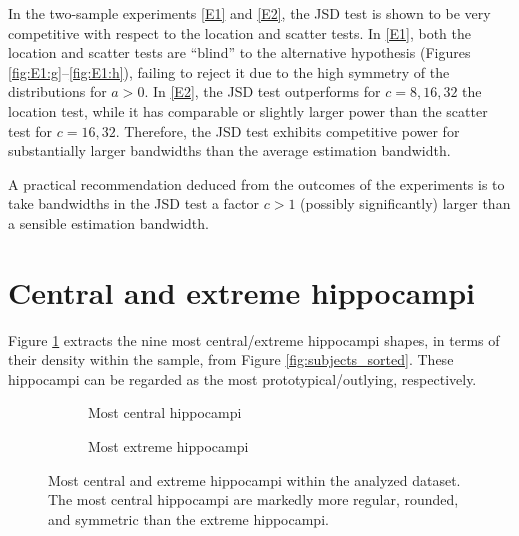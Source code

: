 \documentclass[oneside,11pt]{article}
\begin{document}
In the two-sample experiments \ref{E1} and \ref{E2}, the JSD test is shown to be very competitive with respect to the location and scatter tests. In \ref{E1}, both the location and scatter tests are ``blind'' to the alternative hypothesis (Figures \ref{fig:E1:g}--\ref{fig:E1:h}), failing to reject it due to the high symmetry of the distributions for $a>0$. In \ref{E2}, the JSD test outperforms for $c=8,16,32$ the location test, while it has comparable or slightly larger power than the scatter test for $c=16,32$. Therefore, the JSD test exhibits competitive power for substantially larger bandwidths than the average estimation bandwidth.

A practical recommendation deduced from the outcomes of the experiments is to take bandwidths in the JSD test a factor $c>1$ (possibly significantly) larger than a sensible estimation bandwidth.

\section{Central and extreme hippocampi}
\label{sec:extremehippo}

Figure \ref{fig:in_out} extracts the nine most central/extreme hippocampi shapes, in terms of their density within the sample, from Figure \ref{fig:subjects_sorted}. These hippocampi can be regarded as the most prototypical/outlying, respectively.

\begin{figure}[htpb!]
    \centering
    \begin{subfigure}[t]{0.5\textwidth}
        \centering
        \caption{\small Most central hippocampi}
    \end{subfigure}%
    \begin{subfigure}[t]{0.5\textwidth}
        \centering
        \caption{\small Most extreme hippocampi}
    \end{subfigure}%
    \caption{\small Most central and extreme hippocampi within the analyzed dataset. The most central hippocampi are markedly more regular, rounded, and symmetric than the extreme hippocampi.}
    \label{fig:in_out}
\end{figure}
\end{document}
